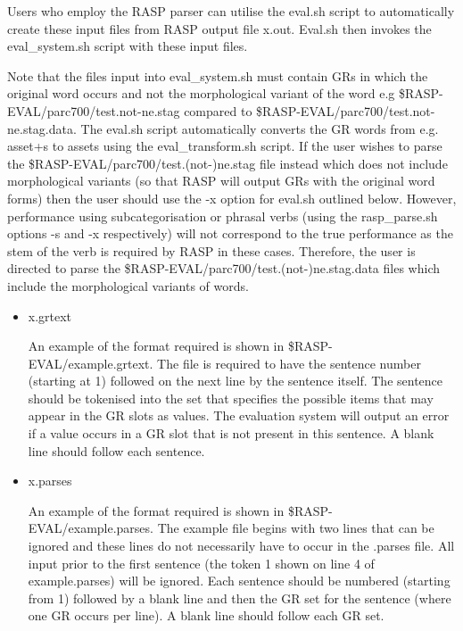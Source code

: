 \documentclass[10pt]{article}
\begin{document}
Users who employ the RASP parser can utilise 
the eval.sh script to automatically
create these input files from RASP output file x.out.
Eval.sh then invokes the eval\_system.sh script with these
input files.

Note that the files input into eval\_system.sh must contain
GRs in which the original word occurs and not the morphological
variant of the word e.g \$RASP-EVAL/parc700/test.not-ne.stag
compared to \$RASP-EVAL/parc700/test.not-ne.stag.data. 
The eval.sh script automatically converts the GR words 
from e.g. asset+s to assets using the eval\_transform.sh script. 
If the user wishes to parse
the \$RASP-EVAL/parc700/test.(not-)ne.stag file instead which
does not include morphological variants (so that RASP will
output GRs with the original word forms) then the user should
use the -x option for eval.sh outlined below. However, performance
using subcategorisation or phrasal verbs (using the rasp\_parse.sh
options -s and -x respectively) will not correspond to the true
performance as the stem of the verb is required by RASP in these
cases. Therefore, the user is directed to parse the 
\$RASP-EVAL/parc700/test.(not-)ne.stag.data files which include
the morphological variants of words.

\begin{itemize}
\item{x.grtext}

An example of the format required is shown in
\$RASP-EVAL/example.grtext. The file is required to have the sentence
number (starting at 1) followed on the next line by the sentence
itself. The sentence should be tokenised into the set 
that specifies the possible items that may appear in the GR slots
as values. The evaluation system will output an error if a value
occurs in a GR slot that is not present in this sentence.
A blank line should follow each sentence.

\item{x.parses}

An example of the format required is shown in
\$RASP-EVAL/example.parses. The example file begins with two lines
that can be ignored and these lines do not necessarily have to
occur in the .parses file. All input prior to the first sentence
(the token 1 shown on line 4 of example.parses) will be ignored.
Each sentence should be numbered (starting from 1) followed by
a blank line and then the GR set for the sentence (where one GR
occurs per line).
A blank line should follow each GR set.
\end{itemize}
\end{document}
